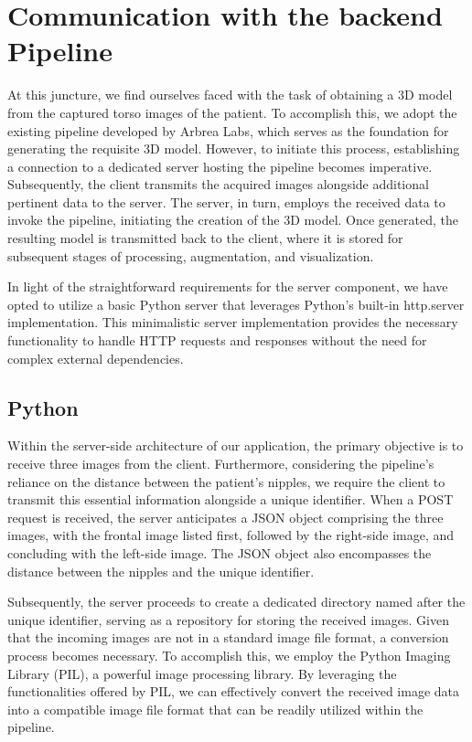 \section{Communication with the backend Pipeline}

At this juncture, we find ourselves faced with the task of obtaining a 3D model from the captured torso images of the patient. To accomplish this, we adopt the existing pipeline developed by Arbrea Labs, 
which serves as the foundation for generating the requisite 3D model. However, to initiate this process, establishing a connection to a dedicated server hosting the pipeline becomes imperative. 
Subsequently, the client transmits the acquired images alongside additional pertinent data to the server. The server, in turn, employs the received data to invoke the pipeline, 
initiating the creation of the 3D model. Once generated, the resulting model is transmitted back to the client, where it is stored for subsequent stages of processing, augmentation, and visualization.

In light of the straightforward requirements for the server component, we have opted to utilize a basic Python server that leverages Python's built-in http.server implementation. 
This minimalistic server implementation provides the necessary functionality to handle HTTP requests and responses without the need for complex external dependencies.

\subsection{Python}

Within the server-side architecture of our application, the primary objective is to receive three images from the client. Furthermore, considering the pipeline's reliance on the distance 
between the patient's nipples, we require the client to transmit this essential information alongside a unique identifier. When a POST request is received, the server anticipates a JSON object 
comprising the three images, with the frontal image listed first, followed by the right-side image, and concluding with the left-side image. The JSON object also encompasses the distance 
between the nipples and the unique identifier.

Subsequently, the server proceeds to create a dedicated directory named after the unique identifier, serving as a repository for storing the received images. Given that the incoming 
images are not in a standard image file format, a conversion process becomes necessary. To accomplish this, we employ the Python Imaging Library (PIL), a powerful image processing library. 
By leveraging the functionalities offered by PIL, we can effectively convert the received image data into a compatible image file format that can be readily utilized within the pipeline. 

